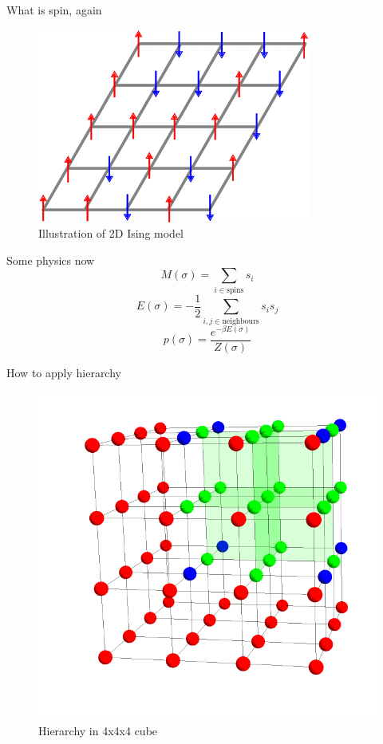 \documentclass{beamer}
\begin{document}
\begin{frame}{What is spin, again}
    \begin{figure}
        \centering
        \includegraphics[width=0.8\textwidth]{ising.png}
        \caption{Illustration of 2D Ising model}
    \end{figure}
\end{frame}

\begin{frame}{Some physics now}
    $$M(\sigma)=\sum_{i\in\text{spins}} s_i$$
    $$E(\sigma)=-\frac{1}{2}\sum_{i,j\in\text{neighbours}} s_i s_j$$
    $$p(\sigma)=\frac{e^{-\beta E(\sigma)}}{Z(\sigma)}$$
\end{frame}

\begin{frame}{How to apply hierarchy}
    \begin{figure}
        \centering
        \includegraphics[width=0.6\linewidth]{hierarchy.png}
        \caption{Hierarchy in 4x4x4 cube}
    \end{figure}
\end{frame}
\end{document}
